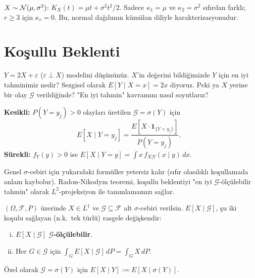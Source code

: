 \begin{ornek}
$X \sim \mathcal{N}(\mu, \sigma^2)$: $K_X(t) = \mu t + \sigma^2 t^2/2$.
Sadece $\kappa_1 = \mu$ ve $\kappa_2 = \sigma^2$ sıfırdan farklı;
$r \geq 3$ için $\kappa_r = 0$.
Bu, normal dağılımın kümülan diliyle karakterizasyonudur.
\end{ornek}

\section{Koşullu Beklenti}
\label{sec:kosullu_beklenti}

\begin{kesif}
$Y = 2X + \varepsilon$ ($\varepsilon \perp X$) modelini düşününüz.
$X$'in değerini bildiğimizde $Y$ için en iyi tahminimiz nedir?
Sezgisel olarak $E[Y \mid X = x] = 2x$ diyoruz.
Peki ya $X$ yerine bir olay $\mathcal{G}$ verildiğinde?
"En iyi tahmin" kavramını nasıl soyutlarız?
\end{kesif}

\begin{tanim}
\label{def:kosullu_beklenti_elem}
\textbf{Kesikli:} $P(Y = y_j) > 0$ olayları üretilen $\mathcal{G} = \sigma(Y)$ için
\[
  E[X \mid Y = y_j] = \frac{E[X \cdot \mathbf{1}_{\{Y=y_j\}}]}{P(Y = y_j)}.
\]
\textbf{Sürekli:} $f_Y(y) > 0$ ise $E[X \mid Y = y] = \int x \, f_{X|Y}(x \mid y) \, dx$.
\end{tanim}

\begin{tanimgerekce}
Genel $\sigma$-cebiri için yukarıdaki formüller yetersiz kalır (sıfır olasılıklı koşullamada anlam kaybolur).
Radon-Nikodym teoremi, koşullu beklentiyi "en iyi $\mathcal{G}$-ölçülebilir tahmin"
olarak $L^2$-projeksiyon ile tanımlamamızı sağlar.
\end{tanimgerekce}

\begin{tanim}
\label{def:kosullu_beklenti}
$(\Omega, \mathcal{F}, P)$ üzerinde $X \in L^1$ ve $\mathcal{G} \subseteq \mathcal{F}$
alt $\sigma$-cebiri verilsin. $E[X \mid \mathcal{G}]$, şu iki koşulu sağlayan
(n.k.\ tek türlü) rasgele değişkendir:
\begin{enumerate}[(i)]
  \item $E[X \mid \mathcal{G}]$ \textbf{$\mathcal{G}$-ölçülebilir}.
  \item Her $G \in \mathcal{G}$ için $\int_G E[X \mid \mathcal{G}] \, dP = \int_G X \, dP$.
\end{enumerate}
Özel olarak $\mathcal{G} = \sigma(Y)$ için $E[X \mid Y] := E[X \mid \sigma(Y)]$.
\end{tanim}

